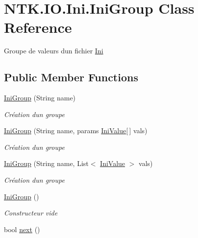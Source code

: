 \hypertarget{class_n_t_k_1_1_i_o_1_1_ini_1_1_ini_group}{}\section{N\+T\+K.\+I\+O.\+Ini.\+Ini\+Group Class Reference}
\label{class_n_t_k_1_1_i_o_1_1_ini_1_1_ini_group}


Groupe de valeurs d\textquotesingle{}un fichier \mbox{\hyperlink{namespace_n_t_k_1_1_i_o_1_1_ini}{Ini}}  


\subsection*{Public Member Functions}
\begin{DoxyCompactItemize}
\item 
\mbox{\hyperlink{class_n_t_k_1_1_i_o_1_1_ini_1_1_ini_group_a3e8d8a73cfa85640fd9328d0fe0fd5fd}{Ini\+Group}} (String name)
\begin{DoxyCompactList}\small\item\em Création d\textquotesingle{}un groupe \end{DoxyCompactList}\item 
\mbox{\hyperlink{class_n_t_k_1_1_i_o_1_1_ini_1_1_ini_group_ac5d8a9a976821f1eedf7b54deaf17c37}{Ini\+Group}} (String name, params \mbox{\hyperlink{class_n_t_k_1_1_i_o_1_1_ini_1_1_ini_value}{Ini\+Value}}\mbox{[}$\,$\mbox{]} vals)
\begin{DoxyCompactList}\small\item\em Création d\textquotesingle{}un groupe \end{DoxyCompactList}\item 
\mbox{\hyperlink{class_n_t_k_1_1_i_o_1_1_ini_1_1_ini_group_a8bb4afc68166c6697f3c22f7abe2596a}{Ini\+Group}} (String name, List$<$ \mbox{\hyperlink{class_n_t_k_1_1_i_o_1_1_ini_1_1_ini_value}{Ini\+Value}} $>$ vals)
\begin{DoxyCompactList}\small\item\em Création d\textquotesingle{}un groupe \end{DoxyCompactList}\item 
\mbox{\hyperlink{class_n_t_k_1_1_i_o_1_1_ini_1_1_ini_group_afc9fb568632d521e30074838de847e4b}{Ini\+Group}} ()
\begin{DoxyCompactList}\small\item\em Constructeur vide \end{DoxyCompactList}\item 
bool \mbox{\hyperlink{class_n_t_k_1_1_i_o_1_1_ini_1_1_ini_group_a60d6cd4e4d115b4e296737d18a549c4a}{next}} ()

\end{DoxyCompactItemize}
